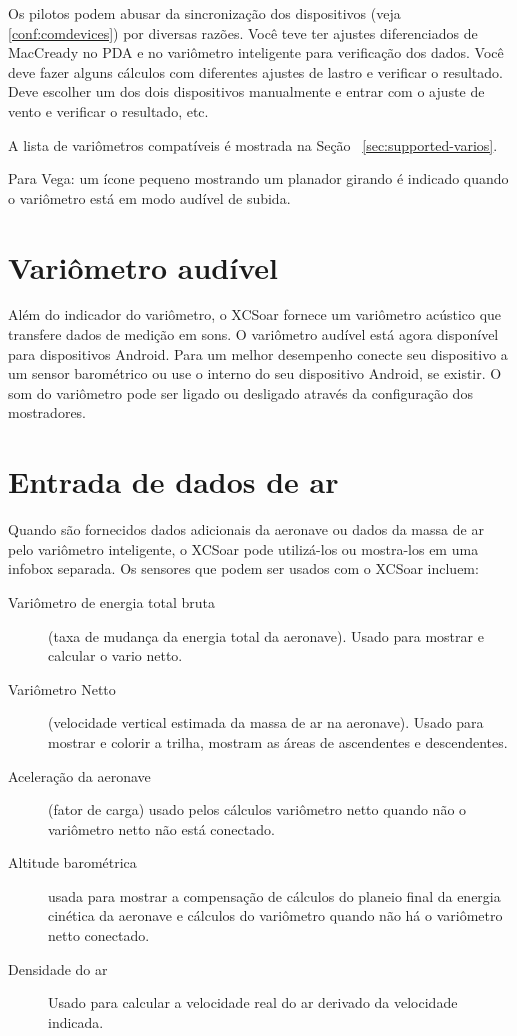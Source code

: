 Os pilotos podem abusar da sincronização dos dispositivos (veja  \ref{conf:comdevices}) por diversas razões.  Você teve ter ajustes diferenciados de MacCready no PDA e no variômetro inteligente para verificação dos dados. Você deve fazer alguns cálculos com diferentes ajustes de lastro e verificar o resultado.  Deve escolher um dos dois dispositivos manualmente e entrar com o ajuste de vento e verificar o resultado, etc.

A lista de variômetros compatíveis é mostrada na Seção ~\ref{sec:supported-varios}.

Para Vega: um ícone pequeno mostrando um planador girando é indicado quando o variômetro está em modo audível de subida.

\section{Variômetro audível}

Além do indicador do variômetro, o XCSoar fornece um variômetro acústico que transfere dados de medição em sons.  O variômetro audível está agora disponível para dispositivos Android.  Para um melhor desempenho conecte seu dispositivo a um sensor barométrico ou use o interno do seu dispositivo Android, se existir.  O som do variômetro pode ser ligado ou desligado através da configuração dos mostradores.


\section{Entrada de dados de ar}

Quando são fornecidos dados adicionais da aeronave ou dados da massa de ar pelo variômetro inteligente, o XCSoar pode utilizá-los ou mostra-los em uma infobox separada.  Os sensores que podem ser usados com o XCSoar incluem:
\begin{description}
\item[Variômetro de energia total bruta] (taxa de mudança da energia total da aeronave).  Usado para mostrar e calcular o vario netto.
\item[Variômetro Netto] (velocidade vertical estimada da massa de ar na aeronave).   Usado para mostrar e colorir a trilha, mostram as áreas de ascendentes e descendentes.
\item[Aceleração da aeronave] (fator de carga) usado pelos cálculos variômetro netto quando não o variômetro netto não está conectado. 
\item[Altitude barométrica] usada para mostrar a compensação de cálculos do planeio final da energia cinética da aeronave e cálculos do variômetro quando não há o variômetro netto conectado.
\item[Densidade do ar] Usado para calcular a velocidade real do ar derivado da velocidade indicada.
\end{description}

